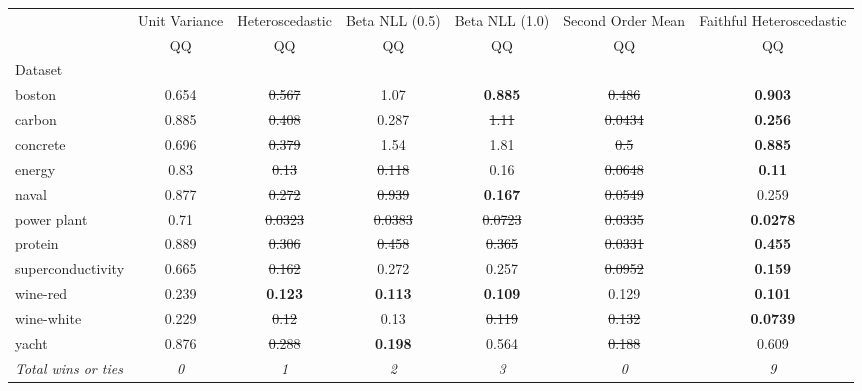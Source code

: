\begin{tabular}{l|c|c|c|c|c|c}
\toprule
{} & {Unit Variance} & {Heteroscedastic} & {Beta NLL (0.5)} & {Beta NLL (1.0)} & {Second Order Mean} & {Faithful Heteroscedastic} \\
{} & {QQ} & {QQ} & {QQ} & {QQ} & {QQ} & {QQ} \\
{Dataset} & {} & {} & {} & {} & {} & {} \\
\midrule
boston & 0.654 & \sout{0.567} & 1.07 & \textbf{0.885} & \sout{0.486} & \textbf{0.903} \\
carbon & 0.885 & \sout{0.408} & 0.287 & \sout{1.11} & \sout{0.0434} & \textbf{0.256} \\
concrete & 0.696 & \sout{0.379} & 1.54 & 1.81 & \sout{0.5} & \textbf{0.885} \\
energy & 0.83 & \sout{0.13} & \sout{0.118} & 0.16 & \sout{0.0648} & \textbf{0.11} \\
naval & 0.877 & \sout{0.272} & \sout{0.939} & \textbf{0.167} & \sout{0.0549} & 0.259 \\
power plant & 0.71 & \sout{0.0323} & \sout{0.0383} & \sout{0.0723} & \sout{0.0335} & \textbf{0.0278} \\
protein & 0.889 & \sout{0.306} & \sout{0.458} & \sout{0.365} & \sout{0.0331} & \textbf{0.455} \\
superconductivity & 0.665 & \sout{0.162} & 0.272 & 0.257 & \sout{0.0952} & \textbf{0.159} \\
wine-red & 0.239 & \textbf{0.123} & \textbf{0.113} & \textbf{0.109} & 0.129 & \textbf{0.101} \\
wine-white & 0.229 & \sout{0.12} & 0.13 & \sout{0.119} & \sout{0.132} & \textbf{0.0739} \\
yacht & 0.876 & \sout{0.288} & \textbf{0.198} & 0.564 & \sout{0.188} & 0.609 \\
\textit{{Total wins or ties}} & \textit{0} & \textit{1} & \textit{2} & \textit{3} & \textit{0} & \textit{9} \\
\bottomrule
\end{tabular}
